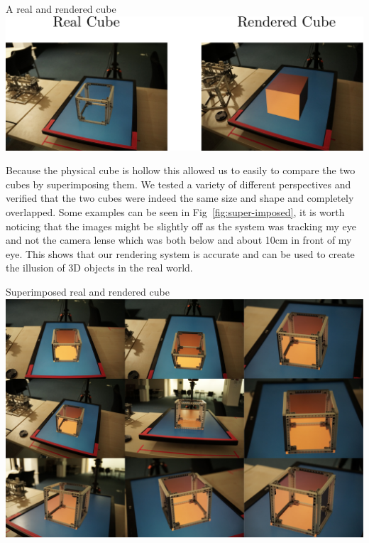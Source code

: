 \begin{figureBox}[label={fig:real-vs-rendered}, width=1.0\linewidth]{A real and rendered cube}
	\includegraphics[width = 1.0\linewidth]{./evaluation/figures/real-vs-rendered.pdf}
\end{figureBox}

Because the physical cube is hollow this allowed us to easily to compare the two cubes by superimposing them. We tested a variety of different perspectives and verified that the two cubes were indeed the same size and shape and completely overlapped. Some examples can be seen in Fig~\ref{fig:super-imposed}, it is worth noticing that the images might be slightly off as the system was tracking my eye and not the camera lense which was both below and about 10cm in front of my eye. This shows that our rendering system is accurate and can be used to create the illusion of 3D objects in the real world. 

\begin{figureBox}[label={fig:super-imposed}, width=1.0\linewidth]{Superimposed real and rendered cube}
	\includegraphics[width = 1.0\linewidth]{./evaluation/figures/super-imposed.pdf}
\end{figureBox}


